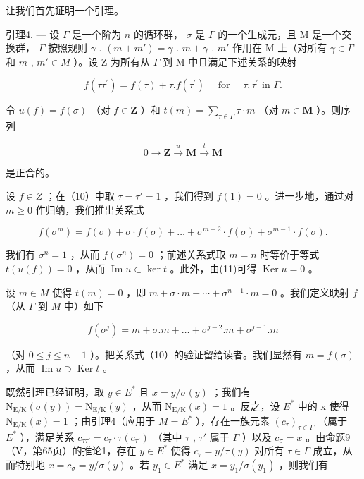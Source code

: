 让我们首先证明一个引理。

引理4. --- 设 \(\Gamma\) 是一个阶为 \(n\) 的循环群， \(\sigma\) 是 \(\Gamma\) 的一个生成元，且 M 是一个交换群， \(\Gamma\) 按照规则 \(\gamma\) . \((m + m') = \gamma\) . \(m + \gamma\) . \(m'\) 作用在 M 上（对所有 \(\gamma \in \Gamma\) 和 \(m\) , \(m' \in M\) ）。设 Z 为所有从 \(\Gamma\) 到 M 中且满足下述关系的映射

\[
f \left(\tau \tau^ {\prime}\right) = f (\tau) + \tau . f \left(\tau^ {\prime}\right) \quad \text { for } \quad \tau , \tau^ {\prime} \text { in } \Gamma .\tag{10}
\]

令 \(u(f) = f(\sigma)\) （对 \(f \in \mathbf{Z}\) ）和 \(t(m) = \sum_{\tau \in \Gamma} \tau \cdot m\) （对 \(m \in \mathbf{M}\) ）。则序列

\[
0 \to \mathbf {Z} \xrightarrow {u} \mathbf {M} \xrightarrow {t} \mathbf {M}
\]

是正合的。

设 \(f \in Z\) ；在（10）中取 \(\tau = \tau' = 1\) ，我们得到 \(f(1) = 0\) 。进一步地，通过对 \(m \geqslant 0\) 作归纳，我们推出关系式

\[
f (\sigma^ {m}) = f (\sigma) + \sigma \cdot f (\sigma) + \dots + \sigma^ {m - 2} \cdot f (\sigma) + \sigma^ {m - 1} \cdot f (\sigma).\tag{11}
\]

我们有 \(\sigma^n = 1\) ，从而 \(f(\sigma^n) = 0\) ；前述关系式取 \(m = n\) 时等价于等式 \(t(u(f)) = 0\) ，从而 \(\operatorname{Im} u \subset \ker t\) 。此外，由(11)可得 \(\operatorname{Ker} u = 0\) 。

设 \(m \in M\) 使得 \(t(m) = 0\) ，即 \(m + \sigma \cdot m + \cdots + \sigma^{n-1} \cdot m = 0\) 。我们定义映射 \(f\) （从 \(\Gamma\) 到 \(M\) 中）如下

\[
f \left(\sigma^ {j}\right) = m + \sigma . m + \dots + \sigma^ {j - 2}. m + \sigma^ {j - 1}. m\tag{12}
\]

（对 \(0 \leqslant j \leqslant n - 1\) ）。把关系式（10）的验证留给读者。我们显然有 \(m = f(\sigma)\) ，从而 \(\operatorname{Im} u \supset \operatorname{Ker} t\) 。

既然引理已经证明，取 \(y \in E^{*}\) 且 \(x = y / \sigma(y)\) ；我们有 \(\mathrm{N}_{\mathrm{E}/\mathrm{K}}(\sigma(y)) = \mathrm{N}_{\mathrm{E}/\mathrm{K}}(y)\) ，从而 \(\mathrm{N}_{\mathrm{E}/\mathrm{K}}(x) = 1\) 。反之，设 \(E^{*}\) 中的 x 使得 \(\mathrm{N}_{\mathrm{E}/\mathrm{K}}(x) = 1\) ；由引理4（应用于 \(M = E^{*}\) ），存在一族元素 \((c_{\tau})_{\tau \in \Gamma}\) （属于 \(E^{*}\) ），满足关系 \(c_{\tau\tau'} = c_{\tau} \cdot \tau(c_{\tau'})\) （其中 \(\tau\) , \(\tau'\) 属于 \(\Gamma\) ）以及 \(c_{\sigma} = x\) 。由命题9（V，第65页）的推论1，存在 \(y \in E^{*}\) 使得 \(c_{\tau} = y / \tau(y)\) 对所有 \(\tau \in \Gamma\) 成立，从而特别地 \(x = c_{\sigma} = y / \sigma(y)\) 。若 \(y_{1} \in E^{*}\) 满足 \(x = y_{1} / \sigma(y_{1})\) ，则我们有

